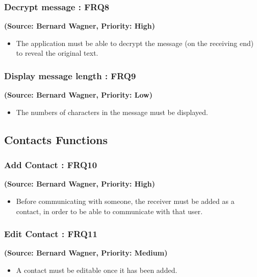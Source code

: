 \subsubsection{Decrypt message : FRQ8}
\textbf{(Source: Bernard Wagner, Priority: High)}
\begin{itemize}
\item The application must be able to decrypt the message (on the receiving end) to reveal the original text.
\end{itemize}
\subsubsection{Display message length : FRQ9}
\textbf{(Source: Bernard Wagner, Priority: Low)}
\begin{itemize}
\item The numbers of characters in the message must be displayed.
\end{itemize}

\subsection{Contacts Functions}

\subsubsection{Add Contact : FRQ10}
\textbf{(Source: Bernard Wagner, Priority: High)}
\begin{itemize}
\item Before communicating with someone, the receiver must be added as a contact, in order to be able to communicate with that user.
\end{itemize}
\subsubsection{Edit Contact : FRQ11}
\textbf{(Source: Bernard Wagner, Priority: Medium)}
\begin{itemize}
\item A contact must be editable once it has been added.
\end{itemize}
